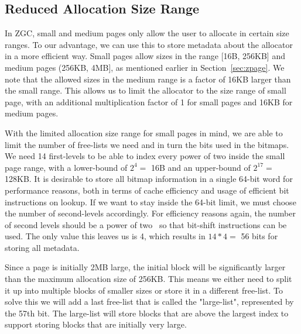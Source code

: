 \subsection{Reduced Allocation Size Range}
\label{sec:adaptations:reduced_allocation_range}

In ZGC, small and medium pages only allow the user to allocate in certain size ranges. To our advantage, we can use this to store metadata about the allocator in a more efficient way. Small pages allow sizes in the range [16B, 256KB] and medium pages (256KB, 4MB], as mentioned earlier in Section~\ref{sec:zpage}. We note that the allowed sizes in the medium range is a factor of 16KB larger than the small range. This allows us to limit the allocator to the size range of small page, with an additional multiplication factor of 1 for small pages and 16KB for medium pages.

With the limited allocation size range for small pages in mind, we are able to limit the number of free-lists we need and in turn the bits used in the bitmaps. We need 14 first-levels to be able to index every power of two inside the small page range, with a lower-bound of $2^4 =$ 16B and an upper-bound of $2^{17} =$ 128KB. It is desirable to store all bitmap information in a single 64-bit word for performance reasons, both in terms of cache efficiency and usage of efficient bit instructions on lookup. If we want to stay inside the 64-bit limit, we must choose the number of second-levels accordingly. For efficiency reasons again, the number of second levels should be a power of two~\cite{TLSF} so that bit-shift instructions can be used. The only value this leaves us is 4, which results in $14 * 4 =$ 56 bits for storing all metadata.

Since a page is initially 2MB large, the initial block will be significantly larger than the maximum allocation size of 256KB. This means we either need to split it up into multiple blocks of smaller sizes or store it in a different free-list. To solve this we will add a last free-list that is called the "large-list", represented by the 57th bit. The large-list will store blocks that are above the largest index to support storing blocks that are initially very large.


